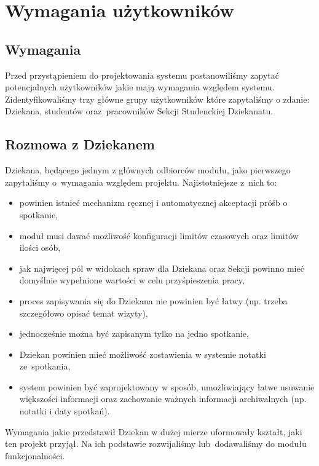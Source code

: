 \documentclass[licencjacka]{pracamgr}
\begin{document}
\chapter{Wymagania użytkowników} \label{chap:wymagania}

\section{Wymagania}
Przed przystąpieniem do projektowania systemu postanowiliśmy zapytać potencjalnych użytkowników jakie mają wymagania względem systemu. Zidentyfikowaliśmy trzy główne grupy użytkowników które zapytaliśmy o zdanie: Dziekana, studentów oraz~pracowników Sekcji Studenckiej Dziekanatu.

\section{Rozmowa z Dziekanem}
Dziekana, będącego jednym z głównych odbiorców modułu, jako pierwszego zapytaliśmy o~wymagania względem projektu. Najistotniejsze z~nich to:

\begin{itemize}
\setlength\itemsep{0,1em}
\item powinien istnieć mechanizm ręcznej i automatycznej akceptacji próśb o spotkanie,
\item moduł musi dawać możliwość konfiguracji limitów czasowych oraz limitów ilości osób,
\item jak najwięcej pól w widokach spraw dla Dziekana oraz Sekcji powinno mieć domyślnie wypełnione wartości w celu przyśpieszenia pracy,
\item proces zapisywania się do Dziekana nie powinien być łatwy (np. trzeba szczegółowo opisać temat wizyty),
\item jednocześnie można być zapisanym tylko na jedno spotkanie,
\item Dziekan powinien mieć możliwość zostawienia w systemie notatki ze~spotkania,
\item system powinien być zaprojektowany w sposób, umożliwiający łatwe usuwanie większości informacji oraz zachowanie ważnych informacji archiwalnych (np. notatki i daty spotkań).
\end{itemize}
Wymagania jakie przedstawił Dziekan w dużej mierze uformowały kształt, jaki ten projekt przyjął. Na ich podstawie rozwijaliśmy lub~dodawaliśmy do modułu funkcjonalności.
\end{document}
